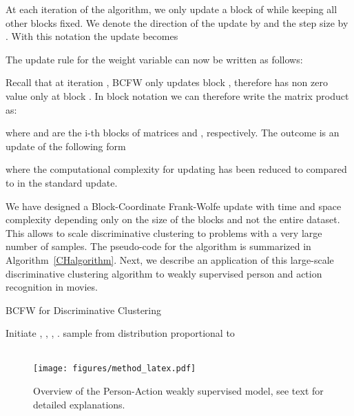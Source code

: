 \documentclass[10pt,twocolumn,letterpaper]{article}
\begin{document}
At each iteration  of the algorithm, we only update a block  of  while keeping all other blocks fixed.
We denote the direction of the update by  and  the step size by .
With this notation the update becomes

The update rule for the weight variable  can now be written as follows:

Recall that at iteration , BCFW only updates block , therefore   has non zero value only at block . 
In block notation we can therefore write the matrix product  as:

where   and  are the i-th blocks of matrices 
 and , respectively. The outcome is an update of the following form

where the computational complexity for updating  has been reduced to  compared to  in
the standard update.


We have designed a Block-Coordinate Frank-Wolfe update with time and space complexity depending only on the size of the blocks and not the entire dataset.
This allows to scale discriminative clustering to problems with a very large number of samples.
The pseudo-code for the algorithm is summarized in Algorithm~\ref{CHalgorithm}. Next, we describe an application of this large-scale discriminative clustering algorithm to weakly supervised person and action recognition in movies. 


\begin{algorithm}[t!]
\caption{BCFW for Discriminative Clustering~\cite{bach07diffrac}}
\label{CHalgorithm}
\begin{algorithmic}
\State Initiate , , , .
\For{  = 1 \ldots }
\State   sample from distribution proportional to  \cite{osokin16bcfw}
\State 
{}
\EndFor
\end{algorithmic}
\end{algorithm}

\begin{figure*}[t]
  \begin{center}
    \mbox{}\vspace{-.6cm}\\
     \texttt{[image: figures/method\_latex.pdf]}
\end{center}
\vspace{-.3cm}
\caption{Overview of the Person-Action weakly supervised model, see text for detailed explanations.}
\label{fig:method}
\end{figure*}
\end{document}
